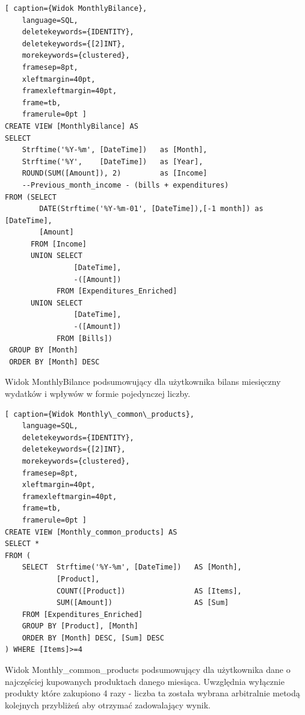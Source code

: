 \documentclass[a4paper,10pt]{report}
\begin{document}
\begin{minipage}{\textwidth}
\begin{lstlisting}[ caption={Widok MonthlyBilance},
    language=SQL,
    deletekeywords={IDENTITY},
    deletekeywords={[2]INT},
    morekeywords={clustered},
    framesep=8pt,
    xleftmargin=40pt,
    framexleftmargin=40pt,
    frame=tb,
    framerule=0pt ]
CREATE VIEW [MonthlyBilance] AS 
SELECT 
    Strftime('%Y-%m', [DateTime])   as [Month],
    Strftime('%Y',    [DateTime])   as [Year],
    ROUND(SUM([Amount]), 2)         as [Income]
    --Previous_month_income - (bills + expenditures)
FROM (SELECT 
        DATE(Strftime('%Y-%m-01', [DateTime]),[-1 month]) as [DateTime],
        [Amount]  
      FROM [Income]
      UNION SELECT
                [DateTime], 
                -([Amount]) 
            FROM [Expenditures_Enriched]
      UNION SELECT
                [DateTime],
                -([Amount])
            FROM [Bills])
 GROUP BY [Month]
 ORDER BY [Month] DESC
\end{lstlisting}
{Widok MonthlyBilance podsumowujący dla użytkownika bilans miesięczny wydatków i
 wpływów w formie pojedynczej liczby.}
\end{minipage}

\begin{minipage}{\textwidth}
\begin{lstlisting}[ caption={Widok Monthly\_common\_products},
    language=SQL,
    deletekeywords={IDENTITY},
    deletekeywords={[2]INT},
    morekeywords={clustered},
    framesep=8pt,
    xleftmargin=40pt,
    framexleftmargin=40pt,
    frame=tb,
    framerule=0pt ]
CREATE VIEW [Monthly_common_products] AS
SELECT * 
FROM (
    SELECT  Strftime('%Y-%m', [DateTime])   AS [Month],
            [Product],
            COUNT([Product])                AS [Items], 
            SUM([Amount])                   AS [Sum]
    FROM [Expenditures_Enriched]
    GROUP BY [Product], [Month]
    ORDER BY [Month] DESC, [Sum] DESC
) WHERE [Items]>=4
\end{lstlisting}
{Widok Monthly\_common\_products podsumowujący dla użytkownika dane o najczęściej 
kupowanych produktach danego miesiąca. Uwzględnia wyłącznie produkty które 
zakupiono 4 razy - liczba ta została wybrana arbitralnie metodą kolejnych 
przybliżeń aby otrzymać zadowalający wynik.}
\end{minipage}
\end{document}
